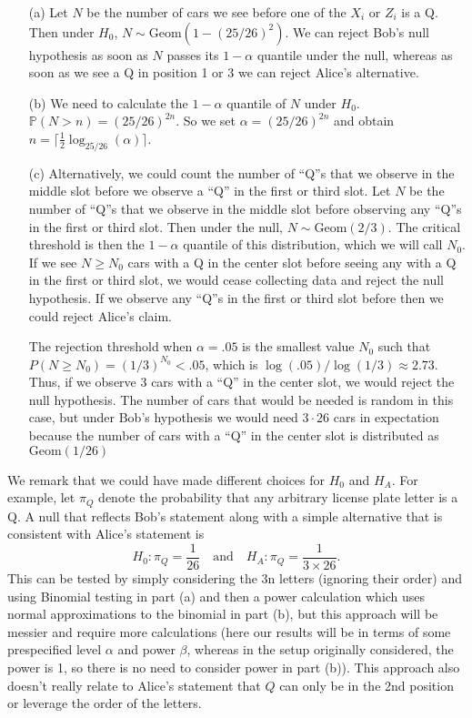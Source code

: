 \begin{enumerate}
\item[(a)]  Let $N$ be the number of cars we see before one of the $X_i$ or $Z_i$ is a Q. Then under $H_0$, $N \sim \text{Geom}\left( 1 - (25/26)^2 \right)$. We can reject Bob's null hypothesis as soon as $N$ passes its $1-\alpha$ quantile under the null, whereas as soon as we see a Q in position 1 or 3 we can reject Alice's alternative.

\item[(b)] We need to calculate the $1-\alpha$ quantile of $N$ under $H_0$. $\mathbb P(N > n) = (25/26)^{2n}$.  So we set $\alpha = (25/26)^{2n}$ and obtain $n=\lceil\frac{1}{2} \log_{25/26}(\alpha)\rceil$.

\item[(c)] Alternatively, we could count the number of ``Q''s that we observe in the middle slot before we observe a ``Q'' in the first or third slot. Let $N$ be the number of ``Q''s that we observe in the middle slot before observing any ``Q''s in the first or third slot. Then under the null, $N \sim \text{Geom}(2/3)$. The critical threshold is then the $1-\alpha$ quantile of this distribution, which we will call $N_0$. If we see $N \ge N_0$ cars with a Q in the center slot before seeing any with a Q in the first or third slot, we would cease collecting data and reject the null hypothesis. If we observe any ``Q''s in the first or third slot before then we could reject Alice's claim.

The rejection threshold when $\alpha = .05$ is the smallest value $N_0$ such that $P(N \ge N_0) = (1/3)^{N_0} < .05$, which is $\log(.05) / \log(1/3) \approx 2.73$. Thus, if we observe 3 cars with a ``Q'' in the center slot, we would reject the null hypothesis. The number of cars that would be needed is random in this case, but under Bob's hypothesis we would need $3 \cdot 26$ cars in expectation because the number of cars with a ``Q'' in the center slot is distributed as $\text{Geom}(1/26)$

\end{enumerate}


We remark that we could have made different choices for $H_0$ and $H_A$. For example, let $\pi_Q$ denote the probability that any arbitrary license plate letter is a Q. A null that reflects Bob's statement along with a simple alternative that is consistent with Alice's statement is $$H_0: \pi_Q= \frac{1}{26} \quad \text{and} \quad H_A: \pi_Q = \frac{1}{3 \times 26}.$$
This can be tested by simply considering the 3n letters (ignoring their order) and using Binomial testing in part (a) and then a power calculation which uses normal approximations to the binomial in part (b), but this approach will be messier and require more calculations (here our results will be in terms of some prespecified level $\alpha$ and power $\beta$, whereas in the setup originally considered, the power is 1, so there is no need to consider power in part (b)). This approach also doesn't really relate to Alice's statement that $Q$ can only be in the 2nd position or leverage the order of the letters. 


	